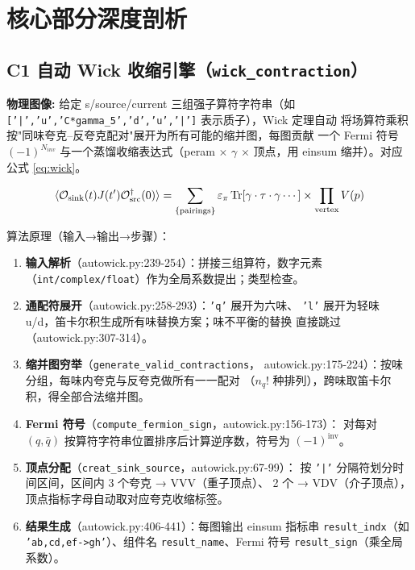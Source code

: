 \documentclass[UTF8]{ctexart}
\begin{document}
\section{核心部分深度剖析}

\subsection{C1 自动 Wick 收缩引擎（\texttt{wick\_contraction}）}

\begin{physbox}
\textbf{物理图像:} 给定 s/source/current 三组强子算符字符串（如
\texttt{['|','u','C*gamma\_5','d','u','|']} 表示质子），Wick 定理自动
将场算符乘积按"同味夸克--反夸克配对"展开为所有可能的缩并图，每图贡献
一个 Fermi 符号 $(-1)^{N_{inv}}$ 与一个蒸馏收缩表达式（peram $\times$
$\gamma$ $\times$ 顶点，用 einsum 缩并）。对应公式 \eqref{eq:wick}。
\end{physbox}

\begin{equation}\label{eq:wick}
\langle \mathcal{O}_{\rm sink}(t) J(t') \mathcal{O}^{\dagger}_{\rm src}(0) \rangle
= \sum_{\{\rm pairings\}} \varepsilon_{\pi}\, \mathrm{Tr}[\gamma \cdot \tau \cdot \gamma \cdots]
\times \prod_{\rm vertex} V(p)
\end{equation}

算法原理（输入→输出→步骤）：

\begin{enumerate}
\item \textbf{输入解析}（autowick.py:239-254）：拼接三组算符，数字元素
（\texttt{int/complex/float}）作为全局系数提出；类型检查。
\item \textbf{通配符展开}（autowick.py:258-293）：\texttt{'q'} 展开为六味、
\texttt{'l'} 展开为轻味 u/d，笛卡尔积生成所有味替换方案；味不平衡的替换
直接跳过（autowick.py:307-314）。
\item \textbf{缩并图穷举}（\texttt{generate\_valid\_contractions}，
autowick.py:175-224）：按味分组，每味内夸克与反夸克做所有一一配对
（$n_q!$ 种排列），跨味取笛卡尔积，得全部合法缩并图。
\item \textbf{Fermi 符号}（\texttt{compute\_fermion\_sign}，autowick.py:156-173）：
对每对 $(q,\bar q)$ 按算符字符串位置排序后计算逆序数，符号为
$(-1)^{\text{inv}}$。
\item \textbf{顶点分配}（\texttt{creat\_sink\_source}，autowick.py:67-99）：
按 \texttt{'|'} 分隔符划分时间区间，区间内 3 个夸克 → VVV（重子顶点）、
2 个 → VDV（介子顶点），顶点指标字母自动取对应夸克收缩标签。
\item \textbf{结果生成}（autowick.py:406-441）：每图输出 einsum 指标串
\texttt{result\_indx}（如 \texttt{'ab,cd,ef->gh'}）、组件名
\texttt{result\_name}、Fermi 符号 \texttt{result\_sign}（乘全局系数）。
\end{enumerate}
\end{document}
